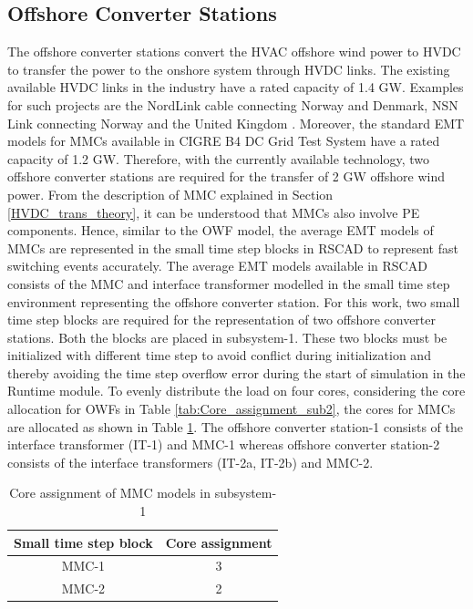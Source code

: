 \subsection{Offshore Converter Stations}\label{offshore_conv_stations}
The offshore converter stations convert the \gls{HVAC} offshore wind power to \gls{HVDC} to transfer the power to the onshore system through \gls{HVDC} links.  %
The existing available \gls{HVDC} links in the industry have a rated capacity of 1.4 GW. Examples for such projects are the NordLink cable connecting Norway and Denmark, NSN Link connecting Norway and the United Kingdom \cite{ryndzionek_evolution_2020}. Moreover, the standard \gls{EMT} models for \gls{MMC}s available in CIGRE B4 DC Grid Test System \cite{vrana2013cigre} have a rated capacity of 1.2 GW. Therefore, with the currently available technology, two offshore converter stations are required for the transfer of 2 GW offshore wind power. From the description of \gls{MMC} explained in Section \ref{HVDC_trans_theory}, it can be understood that \gls{MMC}s also involve \gls{PE} components. Hence, similar to the \gls{OWF} model, the average \gls{EMT} models of \gls{MMC}s are represented in the small time step blocks in RSCAD to represent fast switching events accurately. The average \gls{EMT} models available in RSCAD consists of the \gls{MMC} and interface transformer modelled in the small time step environment representing the offshore converter station. For this work, two small time step blocks are required for the representation of two offshore converter stations. Both the blocks are placed in subsystem-1. These two blocks must be initialized with different time step to avoid conflict during initialization and thereby avoiding the time step overflow error during the start of simulation in the Runtime module. To evenly distribute the load on four cores, considering the core allocation for \gls{OWF}s in Table \ref{tab:Core_assignment_sub2}, the cores for \gls{MMC}s are allocated as shown in Table \ref{tab:Core_assignment_sub1}. The offshore converter station-1 consists of the interface transformer (IT-1) and \gls{MMC}-1 whereas offshore converter station-2 consists of the interface transformers (IT-2a, IT-2b) and \gls{MMC}-2. 

\begin{table}[H]
\centering
\begin{tabular}{|c|c|}
\hline
\textbf{Small time step block} & \textbf{Core assignment} \\ \hline
MMC-1                          & 3                        \\ \hline
MMC-2                          & 2                        \\ \hline

\end{tabular}
\caption{Core assignment of MMC models in subsystem-1}
\label{tab:Core_assignment_sub1}
\end{table}


